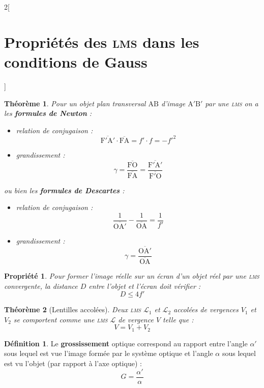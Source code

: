 \documentclass[french]{book}
\newtheorem*{theoreme}{Théorème}
\newtheorem*{propriete}{Propriété}
\theoremstyle{definition}
\newtheorem*{definition}{Définition}
\theoremstyle{remark}
\newcommand*{\point}[1]{\mathrm{#1}}
\newcommand*{\algebrique}[1]{\overline{#1}}
\newcommand*{\tdef}[1]{\textbf{#1}}
\newcommand*{\imp}[1]{\emph{#1}}
\newcommand*{\abr}[1]{\textsc{#1}}
\begin{document}
\begin{landscape}
\begin{multicols*}{2}[\section{Propriétés des \abr{lms} dans les conditions de Gauss}]
\begin{theoreme}
Pour un \imp{objet plan transversal} $\point{A}\point{B}$ d'\imp{image} $\point{A'}\point{B'}$ par une \abr{lms} on a les \tdef{formules de Newton} :

\begin{itemize}
\item \imp{relation de conjugaison} :
\[\algebrique{\point{F'}\point{A'}} \cdot \algebrique{\point{F}\point{A}} = f' \cdot f = -{f'}^2\]

\item \imp{grandissement} :
\[\gamma = \frac{\algebrique{\point{F}\point{O}}}{\algebrique{\point{F}\point{A}}} = \frac{\algebrique{\point{F'}\point{A'}}}{\algebrique{\point{F'}\point{O}}}\]
\end{itemize}

\noindent ou bien les \tdef{formules de Descartes} :

\begin{itemize}
\item \imp{relation de conjugaison} :
\[\frac{1}{\algebrique{\point{O}\point{A'}}} - \frac{1}{\algebrique{\point{O}\point{A}}} = \frac{1}{f'}\]

\item \imp{grandissement} :
\[\gamma = \frac{\algebrique{\point{O}\point{A'}}}{\algebrique{\point{O}\point{A}}}\]
\end{itemize}
\end{theoreme}

\begin{propriete}
Pour former l'\imp{image réelle} sur un \imp{écran} d'un \imp{objet réel} par une \imp{\abr{lms} convergente}, la distance $D$ entre l'objet et l'écran doit vérifier :
\[D \leq 4 f'\]
\end{propriete}

\begin{theoreme}[Lentilles accolées]
Deux \imp{\abr{lms}} $\mathscr{L}_1$ et $\mathscr{L}_2$ \imp{accolées} de vergences $V_1$ et $V_2$ se comportent comme une \abr{lms} $\mathscr{L}$ de vergence $V$ telle que :
\[V = V_1 + V_2\]
\end{theoreme}

\begin{definition}

Le \tdef{grossissement} optique correspond au rapport entre l’angle $\alpha'$ sous lequel est vue l’image formée par le système optique et l’angle $\alpha$ sous lequel est vu l’objet (par rapport à l'axe optique) :
\[G = \frac{\alpha'}{\alpha}\] 
\end{definition}


\end{multicols*}
\end{landscape}
\end{document}
